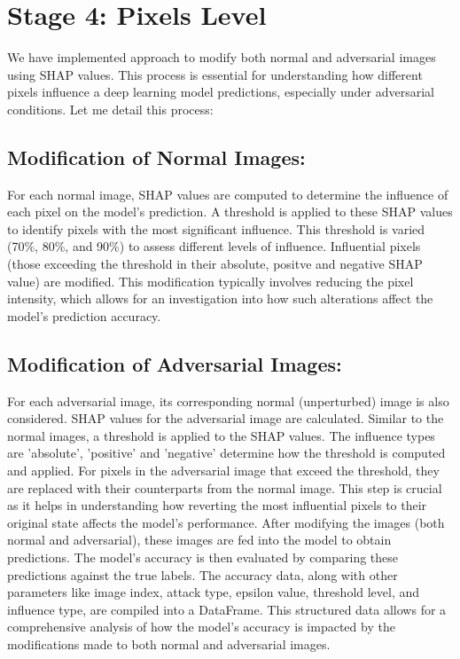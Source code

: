 \documentclass[10pt, conference, a4paper, final]{IEEEtran}
\begin{document}
    
\section{Stage 4: Pixels Level}

We have implemented approach to modify both normal and adversarial images using SHAP values. This process is essential for understanding how different pixels influence a deep learning model predictions, especially under adversarial conditions. Let me detail this process:

\subsection{Modification of Normal Images:}

 For each normal image, SHAP values are computed to determine the influence of each pixel on the model's prediction. A threshold is applied to these SHAP values to identify pixels with the most significant influence. This threshold is varied (70\%, 80\%, and 90\%) to assess different levels of influence. Influential pixels (those exceeding the threshold in their absolute, positve and negative SHAP value) are modified. This modification typically involves reducing the pixel intensity, which allows for an investigation into how such alterations affect the model's prediction accuracy.

\subsection{Modification of Adversarial Images:}
For each adversarial image, its corresponding normal (unperturbed) image is also considered. SHAP values for the adversarial image are calculated. Similar to the normal images, a threshold is applied to the SHAP values. The influence types are 'absolute', 'positive' and 'negative' determine how the threshold is computed and applied. For pixels in the adversarial image that exceed the threshold, they are replaced with their counterparts from the normal image. This step is crucial as it helps in understanding how reverting the most influential pixels to their original state affects the model's performance. After modifying the images (both normal and adversarial), these images are fed into the model to obtain predictions. The model's accuracy is then evaluated by comparing these predictions against the true labels. The accuracy data, along with other parameters like image index, attack type, epsilon value, threshold level, and influence type, are compiled into a DataFrame. This structured data allows for a comprehensive analysis of how the model's accuracy is impacted by the modifications made to both normal and adversarial images.
\end{document}
